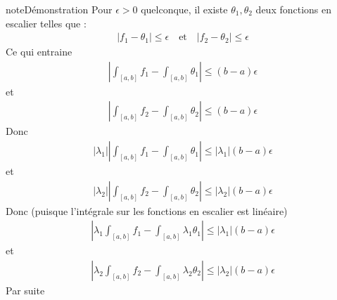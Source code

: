 \documentclass[letterpaper,10pt,french]{sphinxmanual}
\begin{document}
\begin{sphinxadmonition}{note}{Démonstration}
\sphinxAtStartPar
Pour \(\epsilon>0\) quelconque, il existe \(\theta_1, \theta_2\) deux fonctions en escalier telles que :
\begin{equation*}
\begin{split}
|f_1 - \theta_1| \leq \epsilon ~~~ \mbox{ et } ~~~ |f_2 - \theta_2| \leq \epsilon
\end{split}
\end{equation*}
\sphinxAtStartPar
Ce qui entraine
\begin{equation*}
\begin{split}
\left|\int_{[a, b]} f_1- \int_{[a, b]} \theta_1 \right| \leq (b-a)\epsilon
\end{split}
\end{equation*}
\sphinxAtStartPar
et
\begin{equation*}
\begin{split}
\left|\int_{[a, b]} f_2- \int_{[a, b]} \theta_2 \right| \leq (b-a)\epsilon
\end{split}
\end{equation*}
\sphinxAtStartPar
Donc
\begin{equation*}
\begin{split}
|\lambda_1|\left|\int_{[a, b]} f_1- \int_{[a, b]} \theta_1 \right| \leq |\lambda_1|(b-a)\epsilon
\end{split}
\end{equation*}
\sphinxAtStartPar
et
\begin{equation*}
\begin{split}
|\lambda_2|\left|\int_{[a, b]} f_2- \int_{[a, b]} \theta_2 \right| \leq |\lambda_2|(b-a)\epsilon
\end{split}
\end{equation*}
\sphinxAtStartPar
Donc (puisque l’intégrale sur les fonctions en escalier est linéaire)
\begin{equation*}
\begin{split}
\left|\lambda_1\int_{[a, b]} f_1- \int_{[a, b]} \lambda_1\theta_1 \right| \leq |\lambda_1|(b-a)\epsilon
\end{split}
\end{equation*}
\sphinxAtStartPar
et
\begin{equation*}
\begin{split}
\left|\lambda_2\int_{[a, b]} f_2- \int_{[a, b]} \lambda_2\theta_2 \right| \leq |\lambda_2|(b-a)\epsilon
\end{split}
\end{equation*}
\sphinxAtStartPar
Par suite
\begin{equation*}
\begin{split}

\end{split}
\end{equation*}
\end{sphinxadmonition}
\end{document}
